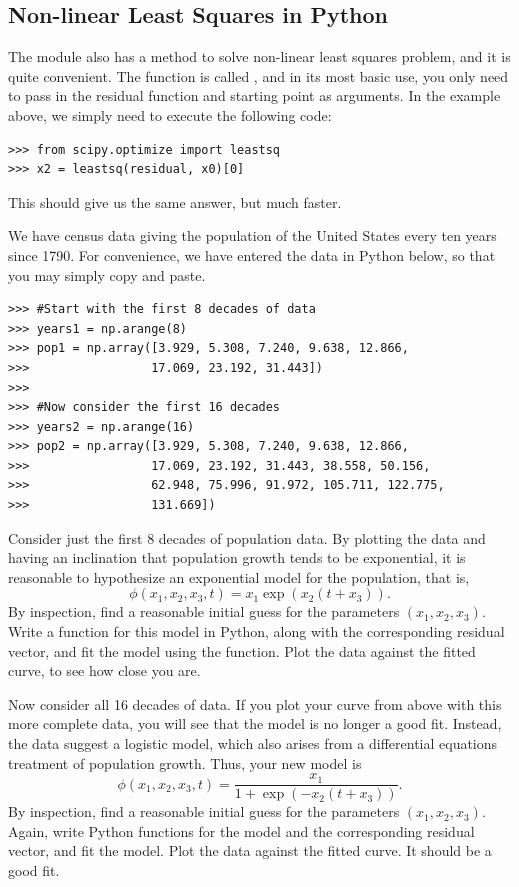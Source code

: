 \subsection*{Non-linear Least Squares in Python}
The module  also has a method to solve non-linear least squares problem, and it
is quite convenient. The function is called , and in its most basic use, you only need
to pass in the residual function and starting point as arguments. In the example above, we simply
need to execute the following code:
\begin{lstlisting}
>>> from scipy.optimize import leastsq
>>> x2 = leastsq(residual, x0)[0]
\end{lstlisting}
This should give us the same answer, but much faster. 
\begin{problem}
We have census data giving the population of the United States every ten years since 1790.
For convenience, we have entered the data in Python below, so that you may simply copy and 
paste.
\begin{lstlisting}
>>> #Start with the first 8 decades of data
>>> years1 = np.arange(8)
>>> pop1 = np.array([3.929, 5.308, 7.240, 9.638, 12.866, 
>>>                 17.069, 23.192, 31.443])
>>>
>>> #Now consider the first 16 decades
>>> years2 = np.arange(16)
>>> pop2 = np.array([3.929, 5.308, 7.240, 9.638, 12.866, 
>>>                 17.069, 23.192, 31.443, 38.558, 50.156, 
>>>                 62.948, 75.996, 91.972, 105.711, 122.775, 
>>>                 131.669])
\end{lstlisting}
Consider just the first 8 decades of population data. By plotting the data and having
an inclination that population growth tends to be exponential, it is reasonable to
hypothesize an exponential model for the population, that is,
$$
\phi(x_1,x_2,x_3,t) = x_1\exp(x_2(t+x_3)).
$$
By inspection, find a reasonable
initial guess for the parameters $(x_1, x_2, x_3)$.
Write a function for this model in Python, along with the corresponding residual vector,
and fit the model using the  function.  Plot the data against the fitted curve, 
to see how close you are.

Now consider all 16 decades of data. If you plot your curve from above with this more complete
data, you will see that the model is no longer a good fit. Instead, the data suggest
a logistic model, which also arises from a differential equations treatment of population growth.
Thus, your new model is
$$
\phi(x_1,x_2,x_3,t) = \frac{x_1}{1+\exp(-x_2(t+x_3))}.
$$
By inspection, find a reasonable
initial guess for the parameters $(x_1, x_2, x_3)$.
Again, write Python functions for the model and the corresponding residual vector,
and fit the model. Plot the data against the fitted curve. It should be a good fit.
\end{problem}